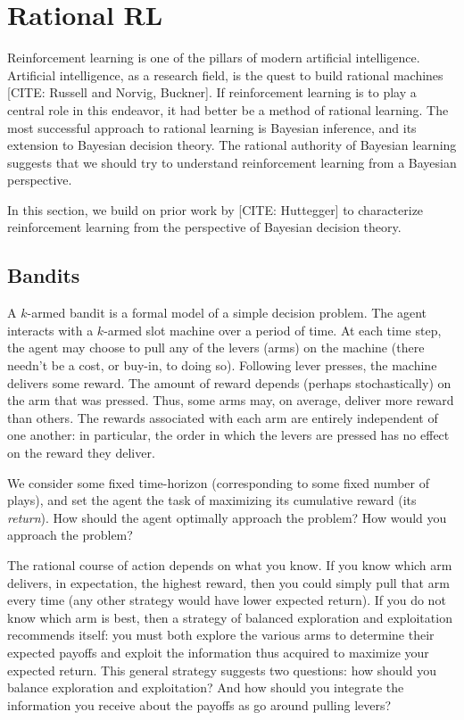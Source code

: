 \documentclass{article}
\begin{document}
	

\section{Rational RL}

Reinforcement learning is one of the pillars of modern artificial intelligence.
Artificial intelligence, as a research field, is the quest to build rational machines [CITE: Russell and Norvig, Buckner].
If reinforcement learning is to play a central role in this endeavor, it had better be a method of rational learning.
The most successful approach to rational learning is Bayesian inference, and its extension to Bayesian decision theory.
The rational authority of Bayesian learning suggests that we should try to understand reinforcement learning from a Bayesian perspective. 

In this section, we build on prior work by [CITE: Huttegger] to characterize reinforcement learning from the perspective of Bayesian decision theory.

\subsection{Bandits}
A $k$-armed bandit is a formal model of a simple decision problem.
The agent interacts with a $k$-armed slot machine over a period of time.
At each time step, the agent may choose to pull any of the levers (arms) on the machine (there needn't be a cost, or buy-in, to doing so).
Following lever presses, the machine delivers some reward.
The amount of reward depends (perhaps stochastically) on the arm that was pressed.
Thus, some arms may, on average, deliver more reward than others.
The rewards associated with each arm are entirely independent of one another: in particular, the order in which the levers are pressed has no effect on the reward they deliver.

We consider some fixed time-horizon (corresponding to some fixed number of plays), and set the agent the task of maximizing its cumulative reward (its \emph{return}).
How should the agent optimally approach the problem?
How would you approach the problem?

The rational course of action depends on what you know.
If you know which arm delivers, in expectation, the highest reward, then you could simply pull that arm every time (any other strategy would have lower expected return).
If you do not know which arm is best, then a strategy of balanced exploration and exploitation recommends itself: you must both explore the various arms to determine their expected payoffs and exploit the information thus acquired to maximize your expected return. 
This general strategy suggests two questions: how should you balance exploration and exploitation? And how should you integrate the information you receive about the payoffs as go around pulling levers?
\end{document}
